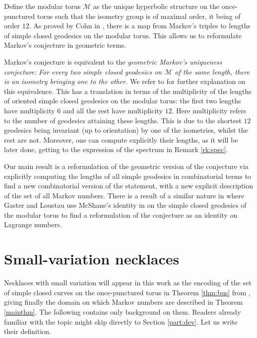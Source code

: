 \documentclass[12pt,reqno]{amsart}
\numberwithin{equation}{part}
\theoremstyle{plain}
\theoremstyle{definition}
\begin{document}
Define the modular torus $\mathcal{M}$ as the unique hyperbolic structure on the once-punctured torus such that the isometry group is of maximal order, it being of order $12$. As proved by Cohn in \cite{Coh71}, there is a map from Markov's triples to lengths of simple closed geodesics on the modular torus. This allows us to reformulate Markov's conjecture in geometric terms. 

Markov's conjecture is equivalent to the \emph{geometric Markov's uniqueness conjecture:} \textit{For every two simple closed geodesics on $\mathcal{M}$ of the same length, there is an isometry bringing one to the other.} We refer to \cite{MP08} for further explanation on this equivalence. This has a translation in terms of the multiplicity of the lengths of oriented simple closed geodesics on the modular torus: the first two lengths have multiplicity $6$ and all the rest have multiplicity $12$. Here multiplicity refers to the number of geodesics attaining these lengths. This is due to the shortest $12$ geodesics being invariant (up to orientation) by one of the isometries, whilst the rest are not. Moreover, one can compute explicitly their lengths, as it will be later done, getting to the expression of the spectrum in Remark \ref{rk:spec}.

Our main result is a reformulation of the geometric version of the conjecture via explicitly computing the lengths of all simple geodesics in combinatorial terms to find a new combinatorial version of the statement, with a new explicit description of the set of all Markov numbers. There is a result of a similar nature in \cite{GL21} where Gaster and Loustau use McShane's identity in \cite{McS98} on the simple closed geodesics of the modular torus to find a reformulation of the conjecture as an identity on Lagrange numbers. 

\part{Small-variation necklaces}\label{part:sv}

Necklaces with small variation will appear in this work as the encoding of the set of simple closed curves on the once-punctured torus in Theorem \ref{thm:bus} from \cite{BS88}, giving finally the domain on which Markov numbers are described in Theorem \ref{mainthm}. The following contains only background on them. Readers already familiar with the topic might skip directly to Section \ref{part:dev}. Let us write their definition.
\end{document}
